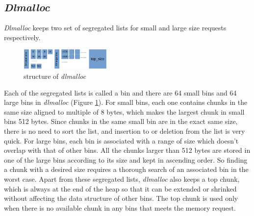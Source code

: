 \documentclass{acm_proc_article-sp}
\begin{document}
\subsection{\emph{Dlmalloc}}
\label{sec_dlmalloc}
\emph{Dlmalloc} keeps two set of segregated lists for small and large size requests respectively. 
\begin{figure}[htbp]
\centering
\includegraphics[width=0.4\textwidth]{fig7}
\caption{structure of \emph{dlmalloc}}\label{fig_7}
\end{figure}
Each of the segregated lists is called a bin and there are 64 small bins and 64 large bins in \emph{dlmalloc} (Figure \ref{fig_7}). For small bins, each one contains chunks in the same size aligned to multiple of 8 bytes, which makes the largest chunk in small bins 512 bytes. Since chunks in the same small bin are in the exact same size, there is no need to sort the list, and insertion to or deletion from the list is very quick. For large bins, each bin is associated with a range of size which doesn't overlap with that of other bins. All the chunks larger than 512 bytes are stored in one of the large bins according to its size and kept in ascending order. So finding a chunk with a desired size requires a thorough search of an associated bin in the worst case. Apart from these segregated lists, \emph{dlmalloc} also keeps a top chunk, which is always at the end of the heap so that it can be extended or shrinked without affecting the data structure of other bins. The top chunk is used only when there is no available chunk in any bins that meets the memory request.
\end{document}
